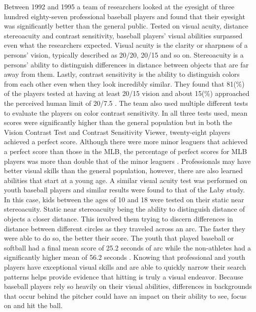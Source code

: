 \documentclass{article}
\begin{document}
\begin{doublespace}
Between 1992 and 1995 a team of researchers looked at the eyesight of three hundred eighty-seven professional baseball players and found that their eyesight was significantly better than the general public. Tested on visual acuity, distance stereoacuity and contrast sensitivity, baseball players’ visual abilities surpassed even what the researchers expected. Visual acuity is the clarity or sharpness of a persons’ vision, typically described as 20/20, 20/15 and so on. Stereoacuity is a persons’ ability to distinguish differences in distance between objects that are far away from them. Lastly, contrast sensitivity is the ability to distinguish colors from each other even when they look incredibly similar. They found that 81(\%) of the players tested at having at least 20/15 vision and about 15(\%) approached the perceived human limit of 20/7.5 \citep{Laby}. The team also used multiple different tests to evaluate the players on color contrast sensitivity. In all three tests used, mean scores were significantly higher than the general population but in both the Vision Contrast Test and Contrast Sensitivity Viewer, twenty-eight players achieved a perfect score. Although there were more minor leaguers that achieved a perfect score than those in the MLB, the percentage of perfect scores for MLB players was more than double that of the minor leaguers \citep{Laby}. Professionals may have better visual skills than the general population, however, there are also learned abilities that start at a young age. A similar visual acuity test was performed on youth baseball players and similar results were found to that of the Laby study. In this case, kids between the ages of 10 and 18 were tested on their static near stereoacuity. Static near stereoacuity being the ability to distinguish distance of objects a closer distance. This involved them trying to discern differences in distance between different circles as they traveled across an arc. The faster they were able to do so, the better their score. The youth that played baseball or softball had a final mean score of 25.2 seconds of arc while the non-athletes had a significantly higher mean of 56.2 seconds \citep{Boden}. Knowing that professional and youth players have exceptional visual skills and are able to quickly narrow their search patterns helps provide evidence that hitting is truly a visual endeavor. Because baseball players rely so heavily on their visual abilities, differences in backgrounds that occur behind the pitcher could have an impact on their ability to see, focus on and hit the ball.   


\end{doublespace}
\end{document}
